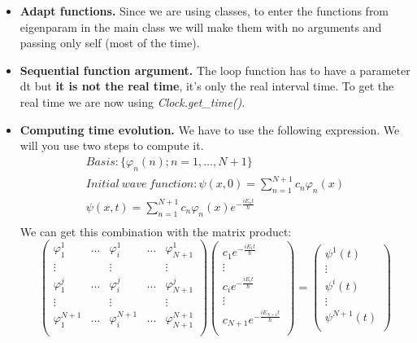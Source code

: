 \documentclass{article}
\begin{document}
\begin{itemize}
	
	\item  \textbf{Adapt functions.} Since we are using classes, to enter the functions from eigenparam in the main class we will make them with no arguments and passing only self (most of the time).
	\item \textbf{Sequential function argument.} The loop function has to have a parameter dt but \textbf{it is not the real time}, it's only the real interval time. To get the real time we are now using \textit{Clock.get\_time()}.
	\item \textbf{Computing time evolution.} We have to use the following expression. We will you use two steps to compute it.
	\[
	\begin{gathered}
	Basis: \{\varphi_n (n); n = 1, \dots, N + 1 \}\\
	Initial\ wave\ function: \psi(x,0)=\sum_{n=1}^{N+1}c_n\varphi_n(x)\\
	\psi(x,t) = \sum_{n=1}^{N+1} c_n \varphi_n (x)e^{-\frac{iE_nt}{\hbar}}\\
	\end{gathered}
	\]
	We can get this combination with the matrix product:
	\[
	\begin{pmatrix}
	\varphi_1^1& \dots & \varphi_i^1 & \dots &  \varphi_{N+1}^1 \\
	\vdots &  & \vdots & & \vdots \\
	\varphi_1^j & \dots &\varphi_i^j& \dots & \varphi_{N+1}^j \\
	\vdots &  & \vdots & & \vdots \\
	\varphi_1^{N+1} &\dots &\varphi_i^{N+1}& \dots & \varphi_{N+1}^{N+1} \\
	\end{pmatrix}
	\begin{pmatrix}
	c_1 e^{-\frac{iE_1t}{\hbar}}\\
	\vdots\\
	c_i e^{-\frac{iE_it}{\hbar}}\\
	\vdots\\
	c_{N + 1} e^{-\frac{iE_{N + 1}t}{\hbar}}\\
	\end{pmatrix}
	=
	\begin{pmatrix}
	\psi^1(t)\\
	\vdots\\
	\psi^i(t)\\
	\vdots\\
	\psi^{N + 1}(t)\\

\end{pmatrix}\]
\end{itemize}
\end{document}
